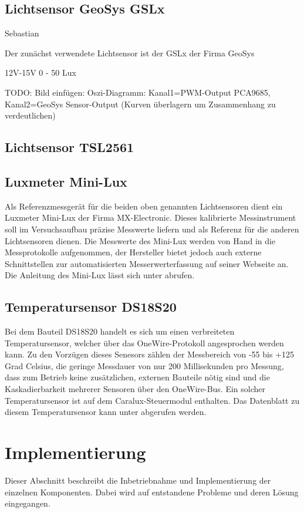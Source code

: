 \documentclass[a4paper,12pt]{scrartcl}
\begin{document}
\subsection{Lichtsensor GeoSys GSLx}
Sebastian

Der zunächst verwendete Lichtsensor ist der GSLx der Firma GeoSys 

12V-15V
0 - 50 Lux

TODO: Bild einf\"ugen: Oszi-Diagramm: Kanal1=PWM-Output PCA9685, Kanal2=GeoSys Sensor-Output (Kurven \"uberlagern um Zusammenhang zu verdeutlichen)

\subsection{Lichtsensor TSL2561}

\subsection{Luxmeter Mini-Lux}
Als Referenzmessgerät für die beiden oben genannten Lichtsensoren dient ein Luxmeter Mini-Lux der Firma MX-Electronic. Dieses kalibrierte Messinstrument soll
im Versuchsaufbau präzise Messwerte liefern und als Referenz für die anderen Lichtsensoren dienen. Die Messwerte des Mini-Lux werden von Hand in die
Messprotokolle aufgenommen, der Hersteller bietet jedoch auch externe Schnittstellen zur automatisierten Messerwerterfassung auf seiner Webseite an. Die
Anleitung des Mini-Lux lässt sich unter \cite{specminilux} abrufen. 

\subsection{Temperatursensor DS18S20}
Bei dem Bauteil DS18S20 handelt es sich um einen verbreiteten Temperatursensor,
welcher über das OneWire-Protokoll angesprochen werden kann. Zu den Vorzügen
dieses Senesors zählen der Messbereich von -55 bis +125 Grad Celsius, die
geringe Messdauer von nur 200 Millisekunden pro Messung, dass zum Betrieb keine
zusätzlichen, externen Bauteile nötig sind und die Kaskadierbarkeit mehrerer
Sensoren über den OneWire-Bus. Ein solcher Temperatursensor ist auf dem
Caralux-Steuermodul enthalten. Das Datenblatt zu diesem Temperatursensor kann
unter \cite{specds1820} abgerufen werden.

\clearpage
\section{Implementierung}
Dieser Abschnitt beschreibt die Inbetriebnahme und Implementierung der einzelnen Komponenten. Dabei wird auf entstandene Probleme und deren Lösung eingegangen. 
\end{document}
